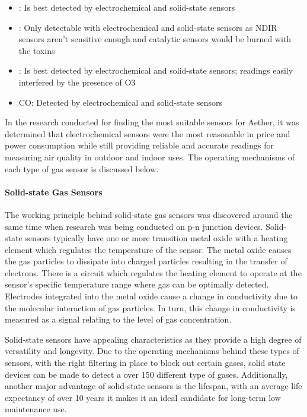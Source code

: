 \begin{itemize}
    \item \ozone: Is best detected by electrochemical and solid-state sensors
    \item \sdo: Only detectable with electrochemical and solid-state sensors as NDIR sensors aren’t sensitive enough and catalytic sensors would be burned with the toxins
    \item \nox : Is best detected by electrochemical and solid-state sensors; readings easily interfered by the presence of O3 
    \item CO: Detected by electrochemical and solid-state sensors
\end{itemize}
In the research conducted for finding the most suitable sensors for Aether, it was determined that electrochemical sensors were the most reasonable in price and power consumption while still providing reliable and accurate readings for measuring air quality in outdoor and indoor uses. The operating mechanisms of each type of gas sensor is discussed below. 

\paragraph{Solid-state Gas Sensors}
The working principle behind solid-state gas sensors was discovered around the same time when research was being conducted on p-n junction devices. Solid-state sensors typically have one or more transition metal oxide with a heating element which regulates the temperature of the sensor. The metal oxide causes the gas particles to dissipate into charged particles resulting in the transfer of electrons. There is a circuit which regulates the heating element to operate at the sensor’s specific temperature range where gas can be optimally detected. Electrodes integrated into the metal oxide cause a change in conductivity due to the molecular interaction of gas particles. In turn, this change in conductivity is measured as a signal relating to the level of gas concentration. 

Solid-state sensors have appealing characteristics as they provide a high degree of versatility and longevity. Due to the operating mechanisms behind these types of sensors, with the right filtering in place to block out certain gases, solid state devices can be made to detect a over 150 different type of gases. Additionally, another major advantage of solid-state sensors is the lifespan, with an average life expectancy of over 10 years it makes it an ideal candidate for long-term low maintenance use. 

